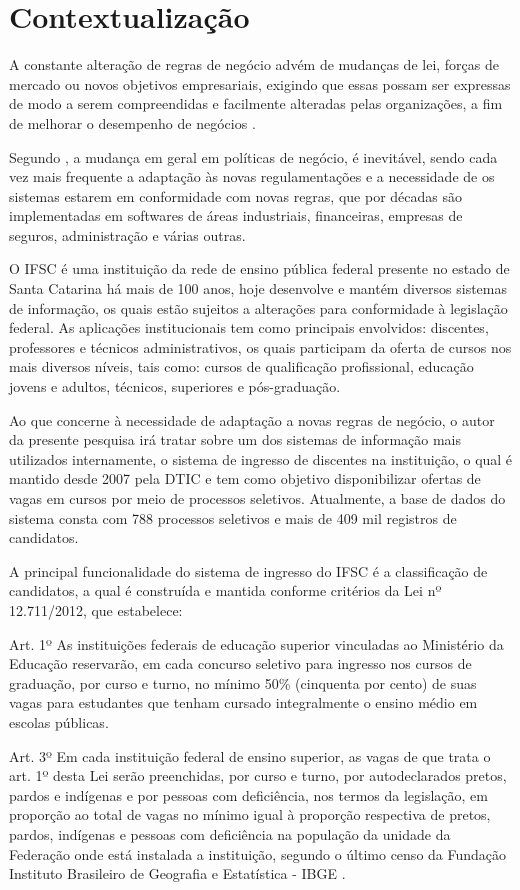 \section{Contextualização}
\label{contextualizacao}

 A constante alteração de regras de negócio advém de mudanças de lei, forças de mercado ou novos objetivos empresariais, exigindo que essas possam ser expressas de modo a serem compreendidas e facilmente alteradas pelas organizações, a fim de melhorar o desempenho de negócios \cite{flexiblerules}.
 
 Segundo , a mudança em geral em políticas de negócio, é inevitável, sendo cada vez mais frequente a adaptação às novas regulamentações e a necessidade de os sistemas estarem em conformidade com novas regras, que por décadas são implementadas em softwares de áreas industriais, financeiras, empresas de seguros, administração e várias outras.
 
 O \gls{IFSC} é uma instituição da rede de ensino pública federal presente no estado de Santa Catarina há mais de 100 anos, hoje desenvolve e mantém diversos sistemas de informação, os quais estão sujeitos a alterações para conformidade à legislação federal. As aplicações institucionais tem como principais envolvidos: discentes, professores e técnicos administrativos, os quais participam da oferta de cursos nos mais diversos níveis, tais como: cursos de qualificação profissional, educação jovens e adultos, técnicos, superiores e pós-graduação. 
 
 Ao que concerne à necessidade de adaptação a novas regras de negócio, o autor da presente pesquisa irá tratar sobre um dos sistemas de informação mais utilizados internamente, o sistema de ingresso de discentes na instituição, o qual é mantido desde 2007 pela \gls{DTIC} e tem como objetivo disponibilizar ofertas de vagas em cursos por meio de processos seletivos. Atualmente, a base de dados do sistema consta com 788 processos seletivos e mais de 409 mil registros de candidatos.
 
 A principal funcionalidade do sistema de ingresso do \gls{IFSC} é a classificação de candidatos, a qual é construída e mantida conforme critérios da Lei nº 12.711/2012, que estabelece:
 \begin{citacao}
 Art. 1º As instituições federais de educação superior vinculadas ao Ministério da Educação reservarão, em cada concurso seletivo para ingresso nos cursos de graduação, por curso e turno, no mínimo 50\% (cinquenta por cento) de suas vagas para estudantes que tenham cursado integralmente o ensino médio em escolas públicas.
 
 Art. 3º Em cada instituição federal de ensino superior, as vagas de que trata o art. 1º desta Lei serão preenchidas, por curso e turno, por autodeclarados pretos, pardos e indígenas e por pessoas com deficiência, nos termos da legislação, em proporção ao total de vagas no mínimo igual à proporção respectiva de pretos, pardos, indígenas e pessoas com deficiência na população da unidade da Federação onde está instalada a instituição, segundo o último censo da Fundação Instituto Brasileiro de Geografia e Estatística - IBGE \cite{leicotas}.  
 \end{citacao}
 
